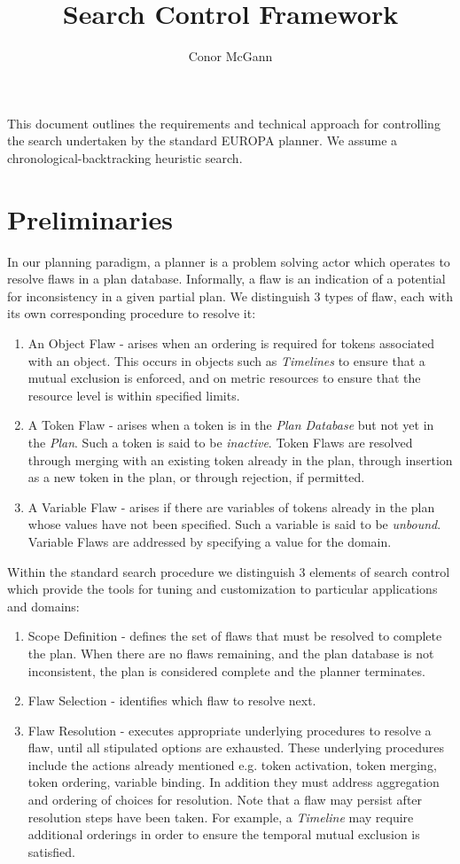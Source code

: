 \documentclass[10pt, letterpaper, oneside]{article}
\author{Conor McGann}
\title{Search Control Framework}
\begin{document}
\maketitle

This document outlines the requirements and technical approach for controlling the search undertaken by the standard EUROPA planner. We assume a chronological-backtracking heuristic search.

\section{Preliminaries}

In our planning paradigm, a planner is a problem solving actor which operates to resolve flaws in a plan database. Informally, a flaw is an indication of a potential for inconsistency in a given partial plan. We distinguish 3 types of flaw, each with its own corresponding  procedure to resolve it:
\begin{enumerate}
\item An Object Flaw - arises when an ordering is required for tokens associated with an object. This occurs in objects such as {\em Timelines} to ensure that a mutual exclusion is enforced, and on metric resources to ensure that the resource level is within specified limits.
\item A Token Flaw - arises when a token is in the {\em Plan Database} but not yet in the {\em Plan}. Such a token is said to be {\em inactive}. Token Flaws are resolved through merging with an existing token already in the plan, through insertion as a new token in the plan, or through rejection, if permitted.
\item A Variable Flaw - arises if there are variables of tokens already in the plan whose values have not been specified. Such a variable is said to be {\em unbound}. Variable Flaws are addressed by specifying a value for the domain. 
\end{enumerate}

Within the standard search procedure we distinguish 3 elements of search control which provide the tools for tuning and customization to particular applications and domains:
\begin{enumerate}
\item Scope Definition - defines the set of flaws that must be resolved to complete the plan. When there are no flaws remaining, and the plan database is not inconsistent, the plan is considered complete and the planner terminates.
\item Flaw Selection - identifies which flaw to resolve next.
\item Flaw Resolution - executes appropriate underlying procedures to resolve a flaw, until all stipulated options are exhausted. These underlying procedures include the actions already mentioned e.g. token activation, token merging, token ordering, variable binding. In addition they must address aggregation and ordering of choices for resolution. Note that a flaw may persist after resolution steps have been taken. For example, a {\em Timeline} may require additional orderings in order to ensure the temporal mutual exclusion is satisfied.
\end{enumerate}
\end{document}
